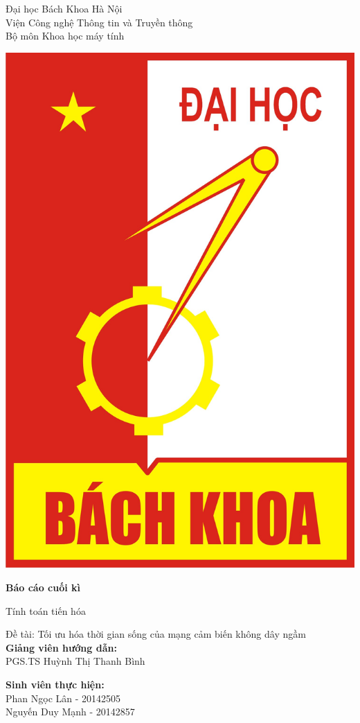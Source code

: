 \documentclass[hidelinks, 11pt, a4paper]{report}
\begin{document}
\begin{titlepage}
    \begin{center}
        Đại học Bách Khoa Hà Nội\\
        Viện Công nghệ Thông tin và Truyền thông\\
        Bộ môn Khoa học máy tính\\
        
        \vspace{20pt}
        
        \includegraphics[scale=0.08]{bklogo.jpg}
        
        \vspace{30pt}
        
        \Huge\textbf{Báo cáo cuối kì}
        
        \huge{Tính toán tiến hóa}
        
        \Large{Đề tài: Tối ưu hóa thời gian sống của mạng cảm biến không dây ngầm}\\
        
        \vspace{30pt}
        \textbf{Giảng viên hướng dẫn:}\\ PGS.TS Huỳnh Thị Thanh Bình
    
        \textbf{Sinh viên thực hiện:}\\
        Phan Ngọc Lân - 20142505\\
        Nguyến Duy Mạnh - 20142857
    \end{center}
\end{titlepage}
\end{document}
